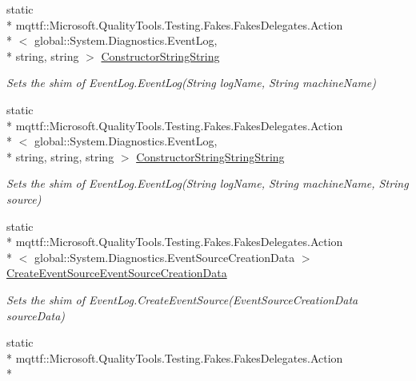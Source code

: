 \begin{DoxyCompactItemize}
static \\*
mqttf\-::\-Microsoft.\-Quality\-Tools.\-Testing.\-Fakes.\-Fakes\-Delegates.\-Action\\*
$<$ global\-::\-System.\-Diagnostics.\-Event\-Log, \\*
string, string $>$ \hyperlink{class_system_1_1_diagnostics_1_1_fakes_1_1_shim_event_log_a406f44312f4fc4b3656b9e31def03966}{Constructor\-String\-String}
\begin{DoxyCompactList}\small\item\em Sets the shim of Event\-Log.\-Event\-Log(\-String log\-Name, String machine\-Name)\end{DoxyCompactList}\item 
static \\*
mqttf\-::\-Microsoft.\-Quality\-Tools.\-Testing.\-Fakes.\-Fakes\-Delegates.\-Action\\*
$<$ global\-::\-System.\-Diagnostics.\-Event\-Log, \\*
string, string, string $>$ \hyperlink{class_system_1_1_diagnostics_1_1_fakes_1_1_shim_event_log_ac82d6d97acfe945b77dcf65e3ea7fea3}{Constructor\-String\-String\-String}
\begin{DoxyCompactList}\small\item\em Sets the shim of Event\-Log.\-Event\-Log(\-String log\-Name, String machine\-Name, String source)\end{DoxyCompactList}\item 
static \\*
mqttf\-::\-Microsoft.\-Quality\-Tools.\-Testing.\-Fakes.\-Fakes\-Delegates.\-Action\\*
$<$ global\-::\-System.\-Diagnostics.\-Event\-Source\-Creation\-Data $>$ \hyperlink{class_system_1_1_diagnostics_1_1_fakes_1_1_shim_event_log_af618875f98faaddb947e192e1fe7558c}{Create\-Event\-Source\-Event\-Source\-Creation\-Data}
\begin{DoxyCompactList}\small\item\em Sets the shim of Event\-Log.\-Create\-Event\-Source(\-Event\-Source\-Creation\-Data source\-Data)\end{DoxyCompactList}\item 
static \\*
mqttf\-::\-Microsoft.\-Quality\-Tools.\-Testing.\-Fakes.\-Fakes\-Delegates.\-Action\\*

\end{DoxyCompactItemize}
